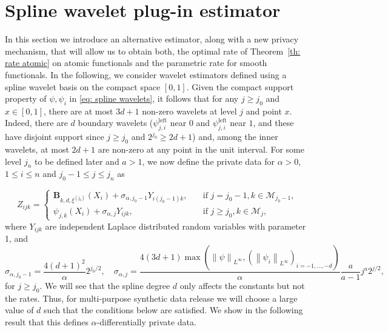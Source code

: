 \documentclass[preprint]{imsart}
\newcommand\norm[1]{\left\lVert#1\right\rVert}
\numberwithin{equation}{section}
\newcounter{cond}
\begin{document}
\section{Spline wavelet plug-in estimator}
\label{sec:WaveletEst}


In this section we introduce an alternative estimator, along with a new privacy mechanism, that will allow us to obtain both, the optimal rate of Theorem~\ref{th: rate atomic} on atomic functionals and the parametric rate for smooth functionals. In the following, we consider wavelet estimators defined using a spline wavelet basis on the compact space $[0,1]$. Given the compact support property of $\psi, \psi_i$ in \eqref{eq: spline wavelets}, it follows that for any $j\geq j_0$ and $x\in[0,1]$, there are at most $3d+1$ non-zero wavelets at level $j$ and point $x$. Indeed, there are $d$ boundary wavelets ($\psi_{j,i}^{\text{left}}$ near $0$ and $\psi_{j,i}^{\text{left}}$ near $1$, and these have disjoint support since $j\geq j_0$ and $2^{j_0}\geq 2d+1$) and, among the inner wavelets, at most $2d+1$ are non-zero at any point in the unit interval. 
For some level $j_n$ to be defined later and $a>1$, we now define the private data for $\alpha>0$, $1\leq i\leq n$ and $j_0-1\leq j\leq j_n$ as

\begin{equation}\label{eq: private spline data}
    Z_{ijk} = \begin{cases}
        \mathbf{B}_{k,d,\xi^{(j_0)}}(X_i) + \sigma_{\alpha,j_0-1}Y_{i(j_0-1)k}, &\quad\text{if }j=j_0-1,k\in\mathcal{M}_{j_0-1},\\
        \psi_{j,k}(X_i)+\sigma_{\alpha,j} Y_{ijk}, &\quad\text{if }j\geq j_0, k\in\mathcal{M}_j,
    \end{cases}
\end{equation}
where $Y_{ijk}$ are independent Laplace distributed random variables with parameter 1, and
\begin{equation}\label{eq: noise spline private}\sigma_{\alpha,j_0-1}= \frac{4(d+1)^2}{\alpha}2^{j_0/2},\quad \sigma_{\alpha,j}=\frac{4(3d+1)\max(\norm{\psi}_{L^\infty},(\norm{\psi_i}_{L^\infty})_{i=-1,\dots,-d})}{\alpha} \frac{a}{a-1}j^a 2^{j/2},\end{equation}
for $j\geq j_0$. We will see that the spline degree $d$ only affects the constants but not the rates. Thus, for multi-purpose synthetic data release we will choose a large value of $d$ such that the conditions below are satisfied. We show in the following result that this defines $\alpha$-differentially private data.
\end{document}
